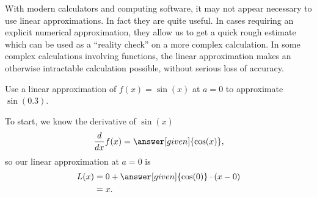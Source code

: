 \documentclass{ximera}
\begin{document}
With modern calculators and computing software, it may not appear
necessary to use linear approximations. In fact they are quite
useful. In cases requiring an explicit numerical approximation, they
allow us to get a quick rough estimate which can be used as a
``reality check'' on a more complex calculation. In some complex
calculations involving functions, the linear approximation makes an
otherwise intractable calculation possible, without serious loss of
accuracy.














\begin{example}%
Use a linear approximation of $f(x) =\sin(x)$ at $a=0$ to approximate
$\sin(0.3)$.
\begin{explanation}
To start, we know the derivative of $\sin(x)$
\[
\frac{d}{dx} f(x) = \answer[given]{\cos(x)},
\]
so our linear approximation at $a=0$ is
\begin{align*}
L(x) &= 0+\answer[given]{\cos(0)}\cdot(x-0)\\
&= x.
\end{align*}
\begin{image}
\end{image}
\end{explanation}
\end{example}
\end{document}
